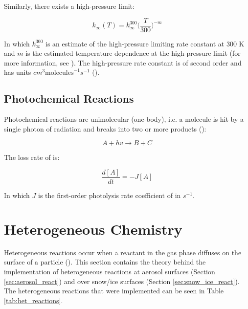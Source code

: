 \medskip

Similarly, there exists a high-pressure limit:

\begin{equation}
    k_\infty(T) = k_\infty^{300}\Big(\frac{T}{300}\Big)^{-m}
    \label{eq:3b_high_pressure}
\end{equation}

In which $k_\infty^{300}$ is an estimate of the high-pressure limiting rate constant at 300 K and $m$ is the estimated temperature dependence at the high-pressure limit (for more information, see \cite{JPL}). The high-pressure rate constant is of second order and has units $cm^3\text{molecules}^{-1}s^{-1}$ (\cite{AtmModFund}).


\subsection{Photochemical Reactions}\label{sec:pchem_reactions}

Photochemical reactions are unimolecular (one-body), i.e. a molecule is hit by a single photon of radiation and breaks into two or more products (\cite{AtmModFund}):

\begin{equation*}
    A + hv \rightarrow B + C
\end{equation*}

The loss rate of  is: 

\begin{equation*}
    \frac{d[A]}{dt} = -J[A]
\end{equation*}

In which $J$ is the first-order photolysis rate coefficient of  in $s^{-1}$. 


\section{Heterogeneous Chemistry}\label{sec:het_chem}

Heterogeneous reactions occur when a reactant in the gas phase diffuses on the surface of a particle (\cite{DAVIES2018}). This section contains the theory behind the implementation of heterogeneous reactions at aerosol surfaces (Section \ref{sec:aerosol_react}) and over snow/ice surfaces (Section \ref{sec:snow_ice_react}). The heterogeneous reactions that were implemented can be seen in Table \ref{tab:het_reactions}. 



